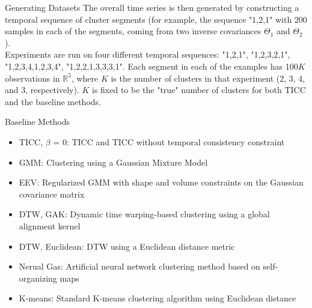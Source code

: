 \documentclass{beamer}
\begin{document}
\begin{frame}{Generating Datasets}
	The overall time series is then generated by constructing a temporal sequence of cluster segments (for example, the sequence "1,2,1" with 200 samples in each of the segments,  coming from two inverse covariances $\Theta_1$ and $\Theta_2$).\\
	\vspace{.5cm}
	Experiments are run on four different temporal sequences: "1,2,1", "1,2,3,2,1", "1,2,3,4,1,2,3,4", "1,2,2,1,3,3,3,1". Each segment in each of the examples has 100$K$ observations in $\mathbb{R}^5$, where $K$ is the
	number of clusters in that experiment (2, 3, 4, and 3, respectively). $K$ is fixed to be the "true" number of clusters for both TICC and the baseline methods.
\end{frame}


\begin{frame}{Baseline Methods}
	\begin{itemize}
		\item TICC, $\beta$ = 0: TICC and TICC without temporal consistency constraint
		\item GMM: Clustering using a Gaussian Mixture Model
		\item EEV: Regularized GMM with shape and volume constraints on the Gaussian covariance matrix
		\item DTW, GAK: Dynamic time warping-based clustering using a global alignment kernel
		\item DTW, Euclidean: DTW using a Euclidean distance metric
		\item Nerual Gas: Artificial neural network clustering method based on self-organizing maps
		\item K-means: Standard K-means clustering algorithm using Euclidean distance
	\end{itemize}
\end{frame}

\end{document}
